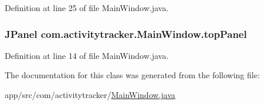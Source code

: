 Definition at line 25 of file Main\+Window.\+java.

\subsubsection[{\texorpdfstring{top\+Panel}{topPanel}}]{\setlength{\rightskip}{0pt plus 5cm}J\+Panel com.\+activitytracker.\+Main\+Window.\+top\+Panel\hspace{0.3cm}{\ttfamily [private]}}\hypertarget{classcom_1_1activitytracker_1_1_main_window_a6baf76b2b8ede1ba82fc6d096ddb580b}{}\label{classcom_1_1activitytracker_1_1_main_window_a6baf76b2b8ede1ba82fc6d096ddb580b}


Definition at line 14 of file Main\+Window.\+java.



The documentation for this class was generated from the following file\+:\begin{DoxyCompactItemize}
\item 
app/src/com/activitytracker/\hyperlink{_main_window_8java}{Main\+Window.\+java}\end{DoxyCompactItemize}
